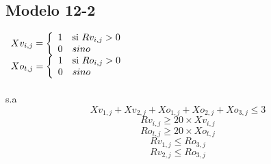\subsection{Modelo 12-2}
$\begin{array}{l}
Xv_{i,j} = \left\{
\begin{array}{l l}
 1 & \mbox{si } Rv_{i,j}>0\\
 0 & sino
\end{array}
\right.\\
Xo_{t,j} = \left\{
\begin{array}{l l}
 1 & \mbox{si } Ro_{i,j}>0\\
 0 & sino
\end{array}
\right.
\end{array}$
\\ \\ 
s.a\\
\begin{equation}
Xv_{1,j} + Xv_{2,j} + Xo_{1,j} + Xo_{2,j} + Xo_{3,j} \leq 3
\end{equation}
\begin{equation}
Rv_{i,j} \geq 20 \times Xv_{i,j}
\end{equation}
\begin{equation}
Ro_{t,j} \geq 20 \times Xo_{t,j}
\end{equation}
\begin{equation}
Rv_{1,j} \leq Ro_{3,j}
\end{equation}
\begin{equation}
Rv_{2,j} \leq Ro_{3,j}
\end{equation}
